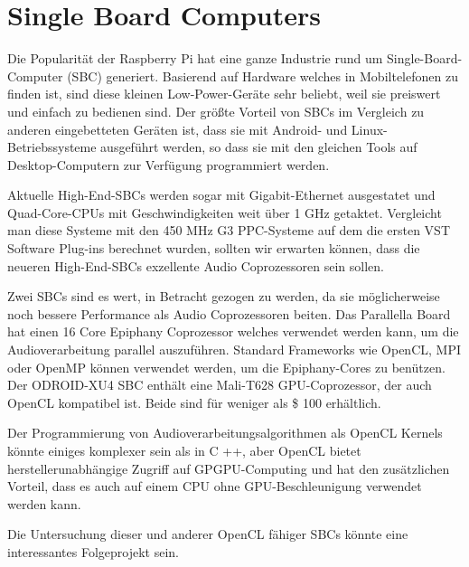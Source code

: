 \section{Single Board Computers}

Die Popularität der Raspberry Pi hat eine ganze Industrie rund um Single-Board-Computer (SBC) generiert. Basierend auf Hardware welches in Mobiltelefonen zu finden ist, sind diese kleinen Low-Power-Geräte sehr beliebt, weil sie preiswert und einfach zu bedienen sind. Der größte Vorteil von SBCs im Vergleich zu anderen eingebetteten Geräten ist, dass sie mit Android- und Linux-Betriebssysteme ausgeführt werden, so dass sie mit den gleichen Tools auf Desktop-Computern zur Verfügung programmiert werden.

Aktuelle High-End-SBCs werden sogar mit Gigabit-Ethernet ausgestatet und Quad-Core-CPUs mit Geschwindigkeiten weit über 1 GHz getaktet. Vergleicht man diese Systeme mit den 450 MHz G3 PPC-Systeme auf dem die ersten VST Software Plug-ins berechnet wurden, sollten wir erwarten können, dass die neueren High-End-SBCs exzellente Audio Coprozessoren sein sollen.

Zwei SBCs sind es wert, in Betracht gezogen zu werden, da sie möglicherweise noch bessere Performance als Audio Coprozessoren beiten. Das Parallella Board hat einen 16 Core Epiphany Coprozessor welches verwendet werden kann, um die Audioverarbeitung parallel auszuführen. Standard Frameworks wie OpenCL, MPI oder OpenMP können verwendet werden, um die Epiphany-Cores zu benützen. Der ODROID-XU4 SBC enthält eine Mali-T628 GPU-Coprozessor, der auch OpenCL kompatibel ist. Beide sind für weniger als \$ 100 erhältlich.

Der Programmierung von Audioverarbeitungsalgorithmen als OpenCL Kernels könnte einiges komplexer sein als in C ++, aber OpenCL bietet herstellerunabhängige Zugriff auf GPGPU-Computing und hat den zusätzlichen Vorteil, dass es auch auf einem CPU ohne GPU-Beschleunigung verwendet werden kann\cite{vst-gpu}.

Die Untersuchung dieser und anderer OpenCL fähiger SBCs könnte eine interessantes Folgeprojekt sein.